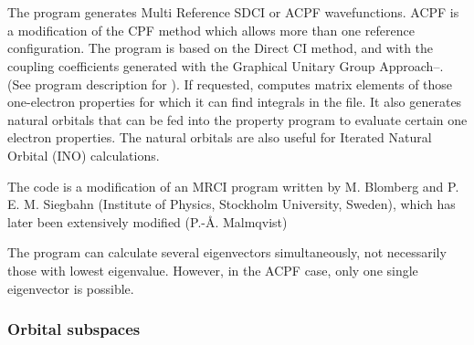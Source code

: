 
\section{}
\label{UG:sec:MRCI}

The
program generates Multi Reference SDCI or ACPF\cite{Gdanitz:88}
wavefunctions. ACPF is a modification of the CPF\cite{Ahlrichs:85}
method which allows more than one reference configuration. The program is
based on the Direct CI method\cite{Roos:72},
and with the coupling coefficients generated with the Graphical Unitary Group
Approach\cite{Shavitt:77}--\cite{Siegbahn:80}.
(See program description for
).
If requested,  computes matrix elements of those
one-electron properties for which it can find integrals in the
 file. It also
generates natural orbitals that can be fed into
the property program to evaluate certain one electron properties.
The natural orbitals are also useful for Iterated Natural Orbital
(INO)  calculations.

The  code is a modification of an MRCI
program written by M. Blomberg and P. E. M. Siegbahn (Institute of Physics,
Stockholm University, Sweden), which has later been extensively modified
(P.-\AA. Malmqvist)

The program can calculate several eigenvectors simultaneously, not
necessarily those with lowest eigenvalue. However, in the ACPF case,
only one single eigenvector is possible.

\subsubsection{Orbital subspaces}

